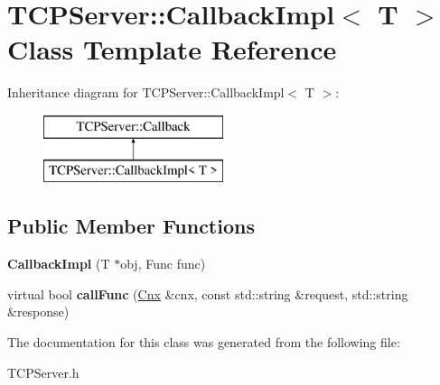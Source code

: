 \hypertarget{class_t_c_p_server_1_1_callback_impl}{\section{T\-C\-P\-Server\-:\-:Callback\-Impl$<$ T $>$ Class Template Reference}
\label{class_t_c_p_server_1_1_callback_impl}
}
Inheritance diagram for T\-C\-P\-Server\-:\-:Callback\-Impl$<$ T $>$\-:\begin{figure}[H]
\begin{center}
\leavevmode
\includegraphics[height=2.000000cm]{class_t_c_p_server_1_1_callback_impl}
\end{center}
\end{figure}
\subsection*{Public Member Functions}
\begin{DoxyCompactItemize}
\item 
\hypertarget{class_t_c_p_server_1_1_callback_impl_a39abe4ac0e2782d2ec0504a01fcdeb1e}{{\bfseries Callback\-Impl} (T $\ast$obj, Func func)}\label{class_t_c_p_server_1_1_callback_impl_a39abe4ac0e2782d2ec0504a01fcdeb1e}

\item 
\hypertarget{class_t_c_p_server_1_1_callback_impl_a7370ad2f2dc50df8f623480f1991381b}{virtual bool {\bfseries call\-Func} (\hyperlink{class_t_c_p_server_1_1_cnx}{Cnx} \&cnx, const std\-::string \&request, std\-::string \&response)}\label{class_t_c_p_server_1_1_callback_impl_a7370ad2f2dc50df8f623480f1991381b}

\end{DoxyCompactItemize}


The documentation for this class was generated from the following file\-:\begin{DoxyCompactItemize}
\item 
T\-C\-P\-Server.\-h\end{DoxyCompactItemize}
